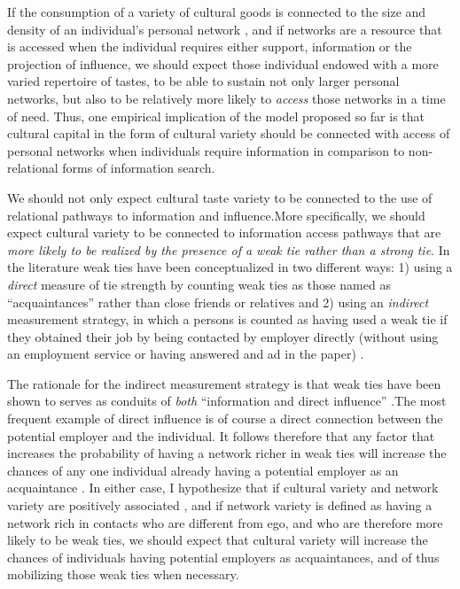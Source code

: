 \documentclass[12pt]{article}
\begin{document}
If the consumption of a variety of cultural goods is connected to the size and density of an individual's personal network \citep{dimaggio87, lizardo06a}, and if networks are a resource that is accessed when the individual requires either support, information or the projection of influence, we should expect those individual endowed with a more varied repertoire of tastes, to be able to sustain not only larger personal networks, but also to be relatively more likely to \emph{access} those networks in a time of need. Thus, one empirical implication of the model proposed so far is that cultural capital in the form of cultural variety should be connected with access of personal networks when individuals require information in comparison to non-relational forms of information search.

We should not only expect cultural taste variety to be connected to the use of relational pathways to information and influence.More specifically, we should expect cultural variety to be connected to information access pathways that are \emph{more likely to be realized by the presence of a weak tie rather than a strong tie}. In the literature weak ties have been conceptualized in two different ways: 1) using a \emph{direct} measure of tie strength by counting weak ties as those named as ``acquaintances'' rather than close friends or relatives \citep{granovetter95, mouw03} and 2) using an \emph{indirect} measurement strategy, in which a persons is counted as having used a weak tie if they obtained their job by being contacted by employer directly (without using an employment service or having answered and ad in the paper) \citep{yakubovich05}.

The rationale for the indirect measurement strategy is that weak ties have been shown to serves as conduits of \emph{both} ``information and direct influence'' \citep[415]{yakubovich05}.The most frequent example of direct influence is of course a direct connection between the potential employer and the individual. It follows therefore that any factor that increases the probability of having a network richer in weak ties will increase the chances of any one individual already having a potential employer as an acquaintance \citep{yakubovich05}.  In either case, I hypothesize that if cultural variety and network variety are positively associated \citep{lizardo06a, erickson96}, and if network variety is defined as having a network rich in contacts who are different from ego, and who are therefore more likely to be weak ties, we should expect that cultural variety will increase the chances of individuals having potential employers as acquaintances, and of thus mobilizing those weak ties when necessary. 
\end{document}
